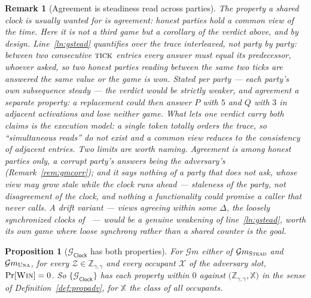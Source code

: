 \documentclass[11pt,a4paper]{article}
\newcommand{\Zenv}{\mathcal{Z}}
\newcommand{\ZenvSet}{\mathbb{Z}}
\newcommand{\op}[1]{\textsc{#1}}
\newcommand{\Gm}{\mathcal{G}m}
\newcommand{\Xset}{\mathbb{X}}
\newcommand{\Win}{\op{Win}}
\newcommand{\Gclock}{\mathcal{G}_{\mathsf{Clock}}}
\theoremstyle{accentdef}
\newtheorem{remark}[definition]{Remark}
\theoremstyle{accentplain}
\newtheorem{proposition}[definition]{Proposition}
\begin{document}
\begin{remark}[Agreement is steadiness read across parties]\label{rem:clockagree}
The property a shared clock is usually wanted for is \emph{agreement}: honest parties hold a
common view of the time. Here it is not a third game but a corollary of the verdict above, and by
design. Line~\ref{ln:gstead} quantifies over the trace \emph{interleaved}, not party by party:
between two consecutive $\op{tick}$ entries every answer must equal its predecessor, whoever
asked, so two honest parties reading between the same two ticks are answered the same value or
the game is won. Stated per party --- each party's own subsequence steady --- the verdict would
be strictly weaker, and agreement a separate property: a replacement could then answer $P$ with
$5$ and $Q$ with $3$ in adjacent activations and lose neither game. What lets one verdict carry
both claims is the execution model: a single token totally orders the trace, so ``simultaneous
reads'' do not exist and a common view reduces to the consistency of adjacent entries. Two limits
are worth naming. Agreement is among honest parties only, a corrupt party's answers being the
adversary's (Remark~\ref{rem:gmcorr}); and it says nothing of a party that does not ask, whose
view may grow stale while the clock runs ahead --- staleness of the party, not disagreement of
the clock, and nothing a functionality could promise a caller that never calls. A \emph{drift}
variant --- views agreeing within some $\Delta$, the loosely synchronized clocks
of~\cite{KMTZ13} --- would be a genuine weakening of line~\ref{ln:gstead}, worth its own game
where loose synchrony rather than a shared counter is the goal.
\end{remark}

\begin{proposition}[$\Gclock$ has both properties]\label{prop:clockprops}
For $\Gm$ either of $\Gm_{\op{Stead}}$ and $\Gm_{\op{Una}}$, for every
$\Zenv \in \ZenvSet_{\gamma,\gamma}$ and every occupant $\mathcal{X}$ of the adversary slot,
$\Pr[\Win] = 0$. So $\{\Gclock\}$ has each property within $0$ against
$\bigl(\ZenvSet_{\gamma,\gamma},\Xset\bigr)$ in the sense of Definition~\ref{def:propadv}, for
$\Xset$ the class of all occupants.
\end{proposition}
\end{document}
